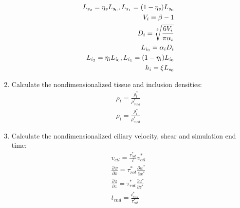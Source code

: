 \documentclass[10pt,a4paper]{article}
\def\non{\nonumber}
\def\p{\partial}
\def\l{\mathit{l}}
\begin{document}
\begin{enumerate}
\begin{eqnarray}
		L_{s_2} = \eta_s L_{s_0}, L_{s_1} = (1 - \eta_s) L_{s_0} \non \\
		V_i = \beta - 1 \non \\
		D_i = \sqrt[\uproot{5}3]{\frac{6 V_i}{\pi \alpha_i}} \non \\
		L_{i_0} = \alpha_i D_i \non \\
		L_{i_2} = \eta_i L_{i_0}, L_{i_1} = (1 - \eta_i) L_{i_0} \non \\
		h_i = \xi L_{s_0} \non \\
	\end{eqnarray}
	\item Calculate the nondimensionalized tissue and inclusion densities:
	\begin{eqnarray}\label{d2ndpars5}
		\rho_t = \frac{\rho_t^*}{\rho_{med}^*} \non \\
		\rho_i = \frac{\rho_i^*}{\rho_{med}^*}
	\end{eqnarray}
	\item Calculate the nondimensionalized ciliary velocity, shear and simulation end time:
	\begin{eqnarray}\label{d2ndpars6}
		v_{cil} = \frac{{\tau^*_{rot}}}{\l}  v^*_{cil} \non \\
		\frac{\p w}{\p x} = \tau^*_{rot} \frac{\p w^*}{\p x^*} \non \\
		\frac{\p u}{\p z} = \tau^*_{rot} \frac{\p u^*}{\p z^*} \non \\
		t_{end} = \frac{t^*_{end}}{\tau^*_{rot}}
	\end{eqnarray}
\end{enumerate}

\newpage 
\end{document}
